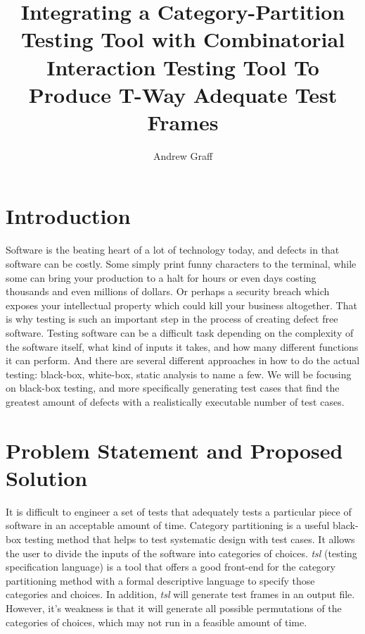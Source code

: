 \documentclass[a4full,12pt]{article}
\title{Integrating a Category-Partition Testing Tool with Combinatorial Interaction
Testing Tool To Produce T-Way Adequate Test Frames}
\author{Andrew Graff}
\begin{document}
\maketitle
\section{Introduction}
Software is the beating heart of a lot of technology today, and defects in that software
  can be costly. Some simply print funny characters to the terminal, while some can bring
  your production to a halt for hours or even days costing thousands and even millions of
  dollars. Or perhaps a security breach which exposes your intellectual property which
  could kill your business altogether. That is why testing is such an important step in
  the process of creating defect free software. Testing software can be a difficult task
  depending on the complexity of the software itself, what kind of inputs it takes, and how
  many different functions it can perform. And there are several different approaches in how
  to do the actual testing: black-box, white-box, static analysis to name a few. We will be
  focusing on black-box testing, and more specifically generating test cases that find the
  greatest amount of defects with a realistically executable number of test cases.
  
\section{Problem Statement and Proposed Solution}
It is difficult to engineer a set of tests that adequately tests a particular piece of software
  in an acceptable amount of time. Category partitioning is a useful black-box testing method that
  helps to test systematic design with test cases. It allows the user to divide
  the inputs of the software into categories of choices. \emph{tsl} (testing specification language) is a tool
  that offers a good front-end for the category partitioning method with a formal descriptive language
  to specify those categories and choices. In addition, \emph{tsl} will generate test frames in an output file.
  However, it's weakness is that it will generate all possible permutations of the categories of choices, which
  may not run in a feasible amount of time.
  
\end{document}
